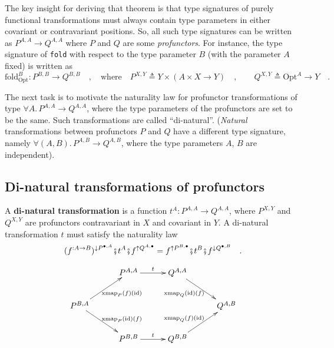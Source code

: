 The key insight for deriving that theorem is that type signatures
of purely functional transformations must always contain type parameters
in either covariant or contravariant positions. So, all such type
signatures can be written as $P^{A,A}\rightarrow Q^{A,A}$ where $P$
and $Q$ are some \emph{profunctors}. For instance, the type signature
of \lstinline!fold! with respect to the type parameter $B$ (with
the parameter $A$ fixed) is written as
\begin{equation}
\text{fold}_{\text{Opt}}^{B}:P^{B,B}\rightarrow Q^{B,B}\quad,\quad\text{where}\quad P^{X,Y}\triangleq Y\times\left(A\times X\rightarrow Y\right)\quad,\quad\quad Q^{X,Y}\triangleq\text{Opt}^{A}\rightarrow Y\quad.\label{eq:fold-type-signature-via-profunctors-derivation1}
\end{equation}

The next task is to motivate the naturality law for profunctor transformations
of type $\forall A.\,P^{A,A}\rightarrow Q^{A,A}$, where the type
parameters of the profunctors are set to be the same. Such transformations
are called ``di-natural''. (\emph{Natural} transformations between
profunctors $P$ and $Q$ have a different type signature, namely
$\forall(A,B).\,P^{A,B}\rightarrow Q^{A,B}$, where the type parameters
$A$, $B$ are independent).

\subsection{Di-natural transformations of profunctors}

A \textbf{di-natural transformation}
is a function $t^{A}:P^{A,A}\rightarrow Q^{A,A}$, where $P^{X,Y}$
and $Q^{X,Y}$ are profunctors contravariant in $X$ and covariant
in $Y$. A di-natural transformation $t$ must satisfy the naturality
law
\begin{equation}
(f^{:A\rightarrow B})^{\downarrow P^{\bullet,A}}\bef t^{A}\bef f^{\uparrow Q^{A,\bullet}}=f^{\uparrow P^{B,\bullet}}\bef t^{B}\bef f^{\downarrow Q^{\bullet,B}}\quad.\label{eq:naturality-law-for-dinatural-transformations-of-profunctors}
\end{equation}

\begin{wrapfigure}{l}{0.43\columnwidth}%
\vspace{-2\baselineskip}
\[
\xymatrix{\xyScaleY{2.0pc}\xyScaleX{2.5pc} & P^{A,A}\ar[r]\sp(0.5){t} & Q^{A,A}\ar[rd]\sb(0.45){\text{xmap}_{Q}(\text{id})(f)}\\
P^{B,A}\ar[rd]\sp(0.55){\text{xmap}_{P}(\text{id})(f)}\ar[ru]\sb(0.55){\text{xmap}_{P}(f)(\text{id})} &  &  & Q^{A,B}\\
 & P^{B,B}\ar[r]\sp(0.5){t} & Q^{B,B}\ar[ru]\sp(0.45){\text{xmap}_{Q}(f)(\text{id})}
}
\]

\vspace{-0.7\baselineskip}
\end{wrapfigure}%

